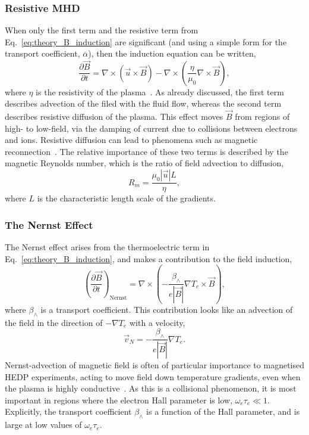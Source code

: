 \subsubsection{Resistive MHD}%
\label{sec:theory_resisMHD}

When only the first term and the resistive term from Eq.~\ref{eq:theory_B_induction} are significant (and using a simple form for the transport coefficient, $\overline{\alpha}$), then the induction equation can be written,
\begin{equation}
    \frac{\partial \vec{B}}{\partial t} = \nabla \times \left( \vec{u}\times\vec{B} \right) - \nabla \times \left( \frac{\eta}{\mu_0}\nabla\times \vec{B} \right),
\end{equation}
where $\eta$ is the resistivity of the plasma~\cite{farrow_extended_2023}.
As already discussed, the first term describes advection of the filed with the fluid flow, whereas the second term describes resistive diffusion of the plasma.
This effect moves $\vec{B}$ from regions of high- to low-field, via the damping of current due to collisions between electrons and ions.
Resistive diffusion can lead to phenomena such as magnetic reconnection~\cite{kuznetsova_multiscale_2007,perez-colljimenez_role_2022}.
The relative importance of these two terms is described by the magnetic Reynolds number, which is the ratio of field advection to diffusion,
\begin{equation}
    R_m = \frac{\mu_0 |\vec{u}| L}{\eta},
\end{equation}
where $L$ is the characteristic length scale of the gradients.

\subsubsection{The Nernst Effect}%
\label{sec:theory_nernst}

The Nernst effect arises from the thermoelectric term in Eq.~\ref{eq:theory_B_induction}, and makes a contribution to the field induction,
\begin{equation}
    \left( \frac{\partial \vec{B}}{\partial t} \right)_{\text{Nernst}} = \nabla \times \left( - \frac{\beta_{\wedge}}{e |\vec{B}|}\nabla T_e \times \vec{B} \right),
\end{equation}
where $\beta_{\wedge}$ is a transport coefficient.
This contribution looks like an advection of the field in the direction of $-\nabla T_e$ with a velocity,
\begin{equation}
    \vec{v}_{N} = -\frac{\beta_{\wedge}}{e |\vec{B}|}\nabla T_e.
\end{equation}
Nernst-advection of magnetic field is often of particular importance to magnetised \ac{HEDP} experiments, acting to move field down temperature gradients, even when the plasma is highly conductive~\cite{slutz_pulsedpowerdriven_2010,walsh_extended_2018}.
As this is a collisional phenomenon, it is most important in regions where the electron Hall parameter is low, $\omega_e\tau_e\ll 1$.
Explicitly, the transport coefficient $\beta_{\wedge}$ is a function of the Hall parameter, and is large at low values of $\omega_e\tau_e$.

